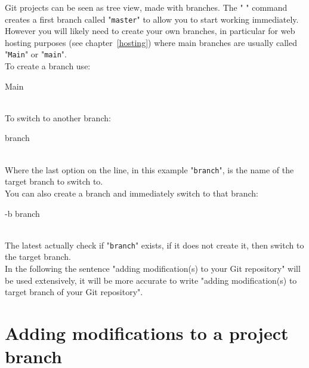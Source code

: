 Git projects can be seen as tree view, made with branches. The " " command creates a first branch called "\texttt{master}" 
to allow you to start working immediately. 
However you will likely need to create your own branches, in particular for web hosting purposes (see chapter~\ref{hosting})
where main branches are usually called "\texttt{Main}" or "\texttt{main}". \\[0.25cm]
To create a branch use: 
\begin{script}
    Main
\end{script} \\[-0.75cm]
\noindent To switch to another branch: 
\begin{script}
   branch
\end{script} \\[-0.75cm]
\noindent Where the last option on the line, in this example "\texttt{branch}", is the name of the target branch to switch to. \\
You can also create a branch and immediately switch to that branch:
\begin{script}
   -b branch
\end{script} \\[-0.75cm]
\noindent The latest actually check if "\texttt{branch}" exists, if it does not create it, then switch to the target branch. \\
In the following the sentence "adding modification(s) to your Git repository" will be used extensively, it will be more accurate to write 
"adding modification(s) to target branch of your Git repository". 

\section{Adding modifications to a project branch}

